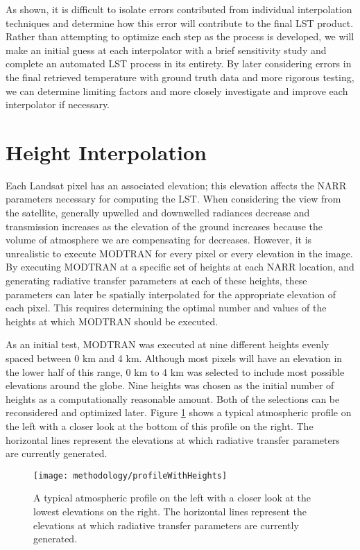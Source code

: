 \documentclass{book}
\begin{document}
As shown, it is difficult to isolate errors contributed from individual interpolation techniques and determine how this error will contribute to the final LST product.  Rather than attempting to optimize each step as the process is developed, we will make an initial guess at each interpolator with a brief sensitivity study and complete an automated LST process in its entirety.  By later considering errors in the final retrieved temperature with ground truth data and more rigorous testing, we can determine limiting factors and more closely investigate and improve each interpolator if necessary.

\section{Height Interpolation}
\label{sec:heightinterpolation}

Each Landsat pixel has an associated elevation; this elevation affects the NARR parameters necessary for computing the LST.  When considering the view from the satellite, generally upwelled and downwelled radiances decrease and transmission increases as the elevation of the ground increases because the volume of atmosphere we are compensating for decreases.  However, it is unrealistic to execute MODTRAN for every pixel or every elevation in the image.  By executing MODTRAN at a specific set of heights at each NARR location, and generating radiative transfer parameters at each of these heights, these parameters can later be spatially interpolated for the appropriate elevation of each pixel.  This requires determining the optimal number and values of the heights at which MODTRAN should be executed.

As an initial test, MODTRAN was executed at nine different heights evenly spaced between 0 km and 4 km.  Although most pixels will have an elevation in the lower half of this range, 0 km to 4 km was selected to include most possible elevations around the globe.  Nine heights was chosen as the initial number of heights as a computationally reasonable amount.  Both of the selections can be reconsidered and optimized later.  Figure \ref{fig:profileWithHeights} shows a typical atmospheric profile on the left with a closer look at the bottom of this profile on the right.  The horizontal lines represent the elevations at which radiative transfer parameters are currently generated.

\begin{figure}[H]
\centering
\texttt{[image: methodology/profileWithHeights]}
\caption{A typical atmospheric profile on the left with a closer look at the lowest elevations on the right.  The horizontal lines represent the elevations at which radiative transfer parameters are currently generated.}
\label{fig:profileWithHeights}
\end{figure}
\end{document}
